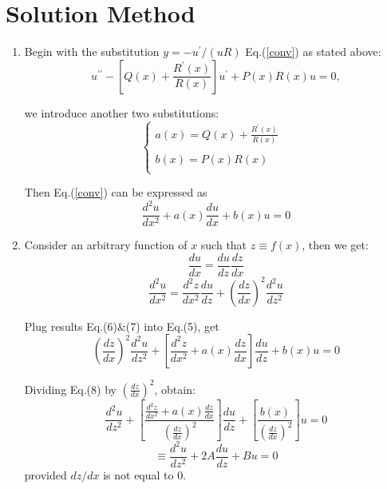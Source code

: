 \documentclass{article}
\begin{document}
\section{Solution Method}
\begin{enumerate}
\item Begin with the substitution $y = - u ^ { \prime } / ( u R )$ Eq.(\ref{conv}) as stated above:
$$u ^ { \prime \prime } - \left[ Q ( x ) + \frac { R ^ { \prime } ( x ) } { R ( x ) } \right] u ^ { \prime } + P ( x ) R ( x ) u = 0,$$ 

we introduce another two substitutions:
$$
\left\{
             \begin{array}{lr}
             a ( x ) = Q ( x ) + \frac { R ^ { \prime } ( x ) } { R ( x ) } &  \\
             ~\\
             b ( x ) = P ( x ) R ( x )\\
             
             \end{array}
\right.
$$

Then Eq.(\ref{conv}) can be expressed as 
\begin{equation}
\frac { d ^ { 2 } u } { d x ^ { 2 } } + a ( x ) \frac { d u } { d x } + b ( x ) u = 0
\end{equation}
\label{odeu}

\item Consider an arbitrary function of $x$ such that $z \equiv f ( x )$, then we get:
\begin{equation}
\frac { d u } { d x } = \frac { d u } { d z } \frac { d z } { d x }
\end{equation}
\begin{equation}
\frac { d ^ { 2 } u } { d x ^ { 2 } } = \frac { d ^ { 2 } z } { d x ^ { 2 } } \frac { d u } { d z } + \left( \frac { d z } { d x } \right) ^ { 2 } \frac { d ^ { 2 } u } { d z ^ { 2 } }
\end{equation}

Plug results Eq.(6)\&(7) into Eq.(5), get
\begin{equation}
\left( \frac { d z } { d x } \right) ^ { 2 } \frac { d ^ { 2 } u } { d z ^ { 2 } } + \left[ \frac { d ^ { 2 } z } { d x ^ { 2 } } + a ( x ) \frac { d z } { d x } \right] \frac { d u } { d z } + b ( x ) u = 0
\end{equation}

Dividing Eq.(8) by $\left( \frac { d z } { d x } \right) ^ { 2 }$, obtain:
\begin{equation}
\frac { d ^ { 2 } u } { d z ^ { 2 } } + \left[ \frac { \frac { d ^ { 2 } z } { d x ^ { 2 } } + a ( x ) \frac { d z } { d x } } { \left( \frac { d z } { d x } \right) ^ { 2 } } \right] \frac { d u } { d z } + \left[ \frac { b ( x ) } { \left( \frac { d z } { d x } \right) ^ { 2 } } \right] u = 0
\end{equation}
\begin{equation}
\equiv \frac { d ^ { 2 } u } { d z ^ { 2 } } + 2 A \frac { d u } { d z } + B u = 0
\end{equation}
provided $dz/dx$ is not equal to 0.


\end{enumerate}
\end{document}
